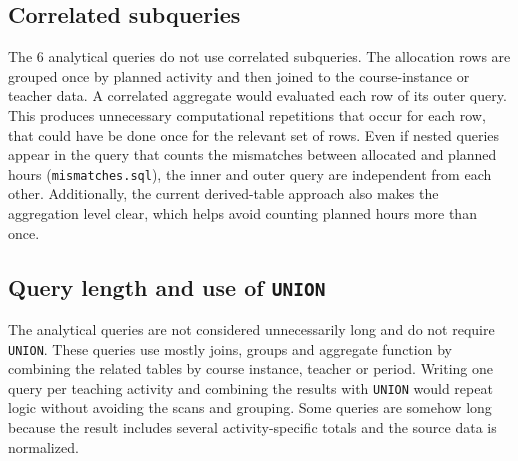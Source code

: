 \documentclass[a4paper]{scrartcl}
\renewcommand{\_}{\textunderscore\allowbreak}
\begin{document}

\subsection{Correlated subqueries}

The 6 analytical queries do not use correlated subqueries. The allocation rows are grouped once by planned activity and then joined to the course-instance or teacher data. A correlated aggregate would evaluated each row of its outer query. This produces unnecessary computational repetitions that occur for each row, that could have be done once for the relevant set of rows. Even if nested queries appear in the query that counts the mismatches between allocated and planned hours (\texttt{mismatches.sql}), the inner and outer query are independent from each other. Additionally, the current derived-table approach also makes the aggregation level clear, which helps avoid counting planned hours more than once.

\subsection{Query length and use of \texttt{UNION}}

The analytical queries are not considered unnecessarily long and do not require \texttt{UNION}. These queries use mostly joins, groups and aggregate function by combining the related tables by course instance, teacher or period. Writing one query per teaching activity and combining the results with \texttt{UNION} would repeat logic without avoiding the scans and grouping. Some queries are somehow long because the result includes several activity-specific totals and the source data is normalized. %
\end{document}
